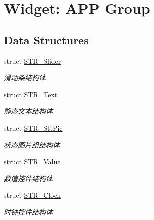 \hypertarget{group___w_i_d_g_e_t}{\section{\-Widget\-: \-A\-P\-P \-Group}
\label{group___w_i_d_g_e_t}
}
\subsection*{\-Data \-Structures}
\begin{DoxyCompactItemize}
\item 
struct \hyperlink{struct_s_t_r___slider}{\-S\-T\-R\-\_\-\-Slider}
\begin{DoxyCompactList}\small\item\em 滑动条结构体 \end{DoxyCompactList}\item 
struct \hyperlink{struct_s_t_r___text}{\-S\-T\-R\-\_\-\-Text}
\begin{DoxyCompactList}\small\item\em 静态文本结构体 \end{DoxyCompactList}\item 
struct \hyperlink{struct_s_t_r___stt_pic}{\-S\-T\-R\-\_\-\-Stt\-Pic}
\begin{DoxyCompactList}\small\item\em 状态图片组结构体 \end{DoxyCompactList}\item 
struct \hyperlink{struct_s_t_r___value}{\-S\-T\-R\-\_\-\-Value}
\begin{DoxyCompactList}\small\item\em 数值控件结构体 \end{DoxyCompactList}\item 
struct \hyperlink{struct_s_t_r___clock}{\-S\-T\-R\-\_\-\-Clock}
\begin{DoxyCompactList}\small\item\em 时钟控件结构体 \end{DoxyCompactList}\end{DoxyCompactItemize}
